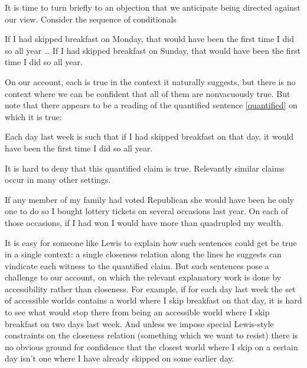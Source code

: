 \documentclass[If.tex]{subfiles}
\begin{document}
It is time to turn briefly to an objection that we anticipate being directed against our view. Consider the sequence of conditionals
\begin{prop}
	\nitem 
		\begin{prop}
			\aitem
			If I had skipped breakfast on Monday, that would have been the first time I did so all year 
			\aitem[b] \ldots{} 
			\aitem[g] 
			If I had skipped breakfast on Sunday, that would have been the first time I did so all year.
		\end{prop}
\end{prop}
On our account, each is true in the context it naturally suggests, but there is no context where we can be confident that all of them are nonvacuously true. But note that there appears to be a reading of the quantified sentence \ref{quantified} on which it is true:
\begin{prop}
	\nitem \label{quantified}
		Each day last week is such that if I had skipped breakfast on that day, it would have been the first time I did so all year.
\end{prop}
It is hard to deny that this quantified claim is true. Relevantly similar claims occur in many other settings.
\begin{prop}
	\nitem 
		If any member of my family had voted Republican she would have been he only one to do so
	\nitem 
		I bought lottery tickets on several occasions last year. On each of those occasions, if I had won I would have more than quadrupled my wealth.
\end{prop}
It is easy for someone like Lewis to explain how such sentences could get be true in a single context: a single closeness relation along the lines he suggests can vindicate each witness to the quantified claim. But such sentences pose a challenge to our account, on which the relevant explanatory work is done by accessibility rather than closeness. For example, if for each day last week the set of accessible worlds contains a world where I skip breakfast on that day, it is hard to see what would stop there from being an accessible world where I skip breakfast on two days last week. And unless we impose special Lewis-style constraints on the closeness relation (something which we want to resist) there is no obvious ground for confidence that the closest world where I skip on a certain day isn't one where I have already skipped on some earlier day.
\end{document}
